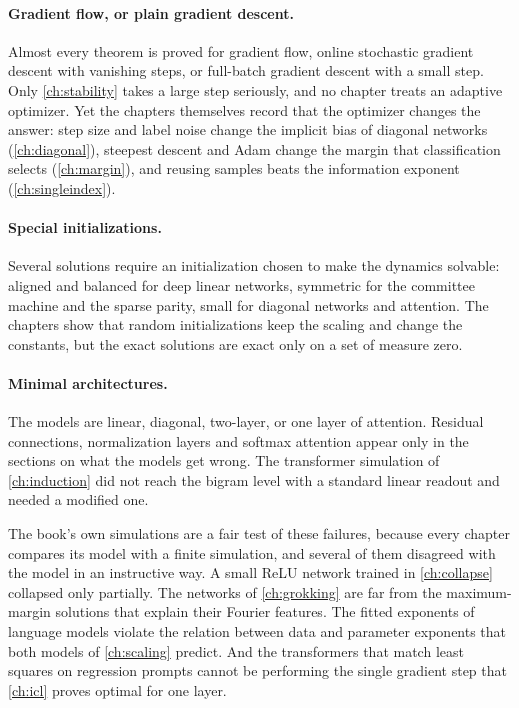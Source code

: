 \begin{refsection}
\paragraph{Gradient flow, or plain gradient descent.} Almost every theorem is proved for gradient flow, online stochastic gradient descent with vanishing steps, or full-batch gradient descent with a small step. Only \cref{ch:stability} takes a large step seriously, and no chapter treats an adaptive optimizer. Yet the chapters themselves record that the optimizer changes the answer: step size and label noise change the implicit bias of diagonal networks (\cref{ch:diagonal}), steepest descent and Adam change the margin that classification selects (\cref{ch:margin}), and reusing samples beats the information exponent (\cref{ch:singleindex}).

\paragraph{Special initializations.} Several solutions require an initialization chosen to make the dynamics solvable: aligned and balanced for deep linear networks, symmetric for the committee machine and the sparse parity, small for diagonal networks and attention. The chapters show that random initializations keep the scaling and change the constants, but the exact solutions are exact only on a set of measure zero.

\paragraph{Minimal architectures.} The models are linear, diagonal, two-layer, or one layer of attention. Residual connections, normalization layers and softmax attention appear only in the sections on what the models get wrong. The transformer simulation of \cref{ch:induction} did not reach the bigram level with a standard linear readout and needed a modified one.

\medskip

The book's own simulations are a fair test of these failures, because every chapter compares its model with a finite simulation, and several of them disagreed with the model in an instructive way. A small ReLU network trained in \cref{ch:collapse} collapsed only partially. The networks of \cref{ch:grokking} are far from the maximum-margin solutions that explain their Fourier features. The fitted exponents of language models violate the relation between data and parameter exponents that both models of \cref{ch:scaling} predict. And the transformers that match least squares on regression prompts cannot be performing the single gradient step that \cref{ch:icl} proves optimal for one layer.


\end{refsection}

